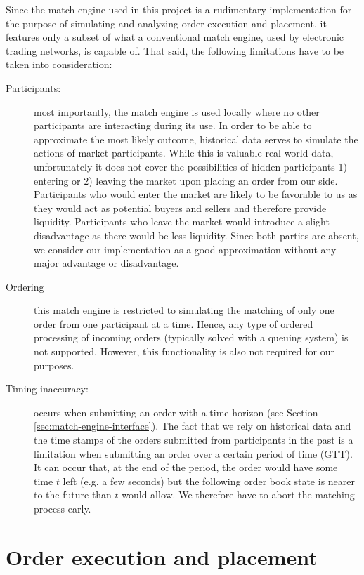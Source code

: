 Since the match engine used in this project is a rudimentary implementation for the purpose of simulating and analyzing order execution and placement, it features only a subset of what a conventional match engine, used by electronic trading networks, is capable of.
That said, the following limitations have to be taken into consideration:
\begin{description}
    \item[Participants:] most importantly, the match engine is used locally where no other participants are interacting during its use.
    In order to be able to approximate the most likely outcome, historical data serves to simulate the actions of market participants.
    While this is valuable real world data, unfortunately it does not cover the possibilities of hidden participants 1) entering or 2) leaving the market upon placing an order from our side.
    Participants who would enter the market are likely to be favorable to us as they would act as potential buyers and sellers and therefore provide liquidity.
    Participants who leave the market would introduce a slight disadvantage as there would be less liquidity.
    Since both parties are absent, we consider our implementation as a good approximation without any major advantage or disadvantage.
    
    \item[Ordering] this match engine is restricted to simulating the matching of only one order from one participant at a time.
    Hence, any type of ordered processing of incoming orders (typically solved with a queuing system) is not supported.
    However, this functionality is also not required for our purposes.
    
    \item[Timing inaccuracy:] occurs when submitting an order with a time horizon (see Section \ref{sec:match-engine-interface}).
    The fact that we rely on historical data and the time stamps of the orders submitted from participants in the past is a limitation when submitting an order over a certain period of time (GTT).
    It can occur that, at the end of the period, the order would have some time $t$ left (e.g. a few seconds) but the following order book state is nearer to the future than $t$ would allow.
    We therefore have to abort the matching process early.
    
\end{description}

\section{Order execution and placement}
\label{sec:execution-placement}

